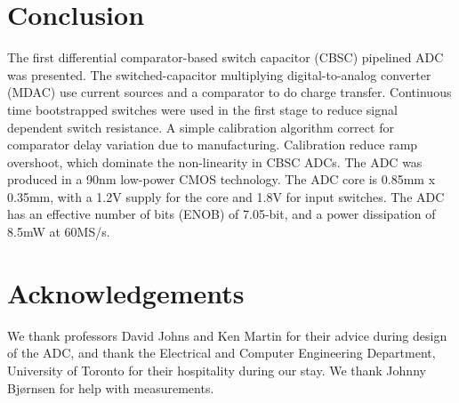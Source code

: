 \section{Conclusion}
The first differential comparator-based switch
capacitor (CBSC) pipelined ADC was presented. The switched-capacitor multiplying
digital-to-analog converter (MDAC)
use current sources and a comparator to do charge transfer. Continuous
time bootstrapped switches were used in the first stage to reduce signal dependent switch
resistance. A simple calibration algorithm correct for
comparator delay variation due to manufacturing. Calibration reduce
ramp overshoot, which dominate the non-linearity in CBSC ADCs. The ADC was produced in a 90nm
low-power CMOS technology. The ADC core is 0.85mm x 0.35mm, with a
1.2V supply for the core and 1.8V for input switches. The ADC
has an effective number of bits (ENOB) of 7.05-bit, and a power
dissipation of 8.5mW at 60MS/s. 

\section*{Acknowledgements}
We thank professors David Johns and Ken Martin
for their advice during design of the ADC, and thank the
Electrical and Computer Engineering Department, University of Toronto
for their hospitality during our stay. We thank Johnny Bj{\o}rnsen for
help with measurements.




